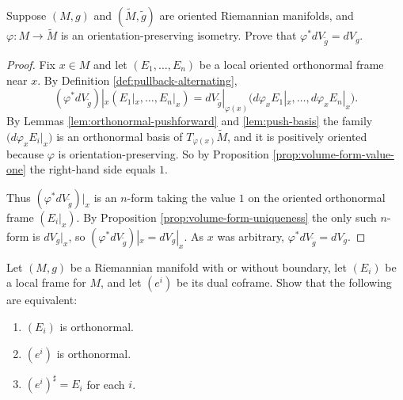 \begin{exercise}\label{exer:isometry-preserves-volume-form}


Suppose $(M,g)$ and $(\tilde{M},\tilde{g})$ are oriented Riemannian manifolds, and $\varphi: M \to \tilde{M}$ is an orientation-preserving isometry. Prove that $\varphi^* dV_{\tilde{g}} = dV_g$.
\end{exercise}
\begin{proof}

Fix $x \in M$ and let $(E_1,\ldots,E_n)$ be a local oriented orthonormal frame near $x$. By
Definition \ref{def:pullback-alternating},
\[
(\varphi^* dV_{\tilde{g}})|_x(E_1|_x,\ldots,E_n|_x)
  = dV_{\tilde{g}}|_{\varphi(x)}\bigl(d\varphi_x E_1|_x, \ldots, d\varphi_x E_n|_x\bigr).
\]
By Lemmas \ref{lem:orthonormal-pushforward} and \ref{lem:push-basis} the family
$\bigl(d\varphi_x E_i|_x\bigr)$ is an orthonormal basis of $T_{\varphi(x)}\tilde{M}$, and it is
positively oriented because $\varphi$ is orientation-preserving. So by Proposition
\ref{prop:volume-form-value-one} the right-hand side equals $1$.

Thus $(\varphi^* dV_{\tilde{g}})|_x$ is an $n$-form taking the value $1$ on the oriented
orthonormal frame $(E_i|_x)$. By Proposition \ref{prop:volume-form-uniqueness} the only such
$n$-form is $dV_g|_x$, so $(\varphi^* dV_{\tilde{g}})|_x = dV_g|_x$. As $x$ was arbitrary,
$\varphi^* dV_{\tilde{g}} = dV_g$.
\end{proof}

\begin{exercise}
\label{exer:orthonormal-frames-and-coframes}


Let $(M, g)$ be a Riemannian manifold with or without boundary, let $(E_i)$ be a local frame for $M$, and let $(e^i)$ be its dual coframe. Show that the following are equivalent:
\begin{enumerate}
\item[(a)] $(E_i)$ is orthonormal.
\item[(b)] $(e^i)$ is orthonormal.
\item[(c)] $(e^i)^{\sharp} = E_i$ for each $i$.
\end{enumerate}
\end{exercise}

